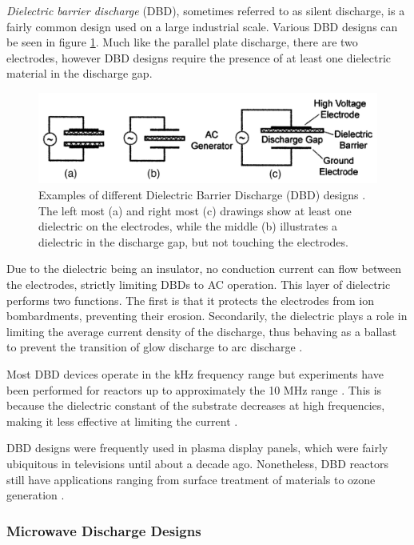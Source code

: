 \textit{Dielectric barrier discharge} (DBD), sometimes referred to as silent discharge, is a fairly common design used on a large industrial scale. Various DBD designs can be seen in figure \ref{fig:dbd_configuartions}. Much like the parallel plate discharge, there are two electrodes, however DBD designs require the presence of at least one dielectric material in the discharge gap. 

\begin{figure}[h!]
	\centering
	\includegraphics[width=\linewidth]{chapter_2/figures/dbd_configurations.png}
	\caption{Examples of different Dielectric Barrier Discharge (DBD) designs \cite{Kogelschatz2003}. The left most (a) and right most (c) drawings show at least one dielectric on the electrodes, while the middle (b) illustrates a dielectric in the discharge gap, but not touching the electrodes.}
	\label{fig:dbd_configuartions}
\end{figure} 

Due to the dielectric being an insulator, no conduction current can flow between the electrodes, strictly limiting DBDs to AC operation. This layer of dielectric performs two functions. The first is that it protects the electrodes from ion bombardments, preventing their erosion. Secondarily, the dielectric plays a role in limiting the average current density of the discharge, thus behaving as a ballast to prevent the transition of glow discharge to arc discharge \cite{Kogelschatz2003}.  

Most DBD devices operate in the kHz frequency range but experiments have been performed for reactors up to approximately the 10 MHz range \cite{Tingay2014}. This is because the dielectric constant of the substrate decreases at high frequencies, making it less effective at limiting the current \cite{Kogelschatz2003}.  

DBD designs were frequently used in plasma display panels, which were fairly ubiquitous in televisions until about a decade ago. Nonetheless, DBD reactors still have applications ranging from surface treatment of materials to ozone generation \cite{Brandenburg2017}.

\subsubsection{Microwave Discharge Designs}
\label{subsec:microwave_discharge}

